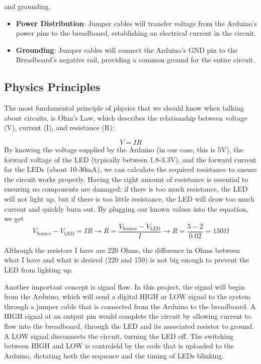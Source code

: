 \documentclass[12pt]{article}
\begin{document}
\begin{itemize}
\begin{itemize}
    and grounding. 
    \begin{itemize}
      \item \textbf{Power Distribution}: Jumper cables will transfer voltage from the Arduino's power pins to the breadboard, establishing an electrical current in the circuit. 
    \end{itemize}
    \begin{itemize}
      \item \textbf{Grounding}: Jumper cables will connect the Arduino's GND pin to the Breadboard's negative rail, providing a common ground for the entire circuit. 
    \end{itemize}
  \end{itemize}
\end{itemize}


\subsection{Physics Principles}

The most fundamental principle of physics that we should know when talking about circuits, is Ohm's Law, which describes the relationship between voltage (V), current (I), and resistance (R):


\begin{equation}
  V=IR
\end{equation}
By knowing the voltage supplied by the Arduino (in our case, this is 5V), the forward voltage of the LED (typically between 1.8-3.3V), and the forward current for the LEDs (about 10-30mA), we can calculate the required resistance to ensure the circuit works properly. Having the right amount of resistance is essential to ensuring no components are damaged; if there is too much resistance, the LED will not light up, but if there is too little resistance, the LED will draw too much current and quickly burn out. 
By plugging our known values into the equation, we get
\begin{equation}
  V_{\textrm{Source}}-V_{\textrm{LED}}=IR \rightarrow R=\frac{V_{\textrm{Source}}-V_{\textrm{LED}}}{I} \rightarrow R=\frac{5-2}{0.02}=150\Omega
\end{equation}


Although the resistors I have are 220 Ohms, the difference in Ohms between what I have and what is desired (220 and 150) is not big enough to prevent the LED from lighting up. 


Another important concept is signal flow. In this project, the signal will begin from the Arduino, which will send a digital HIGH or LOW signal to the system through a jumper cable that is connected from the Arduino to the breadboard. A HIGH signal at an output pin would complete the circuit by allowing current to flow into the breadboard, through the LED and its associated resistor to ground. A LOW signal disconnects the circuit, turning the LED off. The switching between HIGH and LOW is controleld by the code that is uploaded to the Arduino, dictating both the sequence and the timing of LEDs blinking. 
\end{document}
